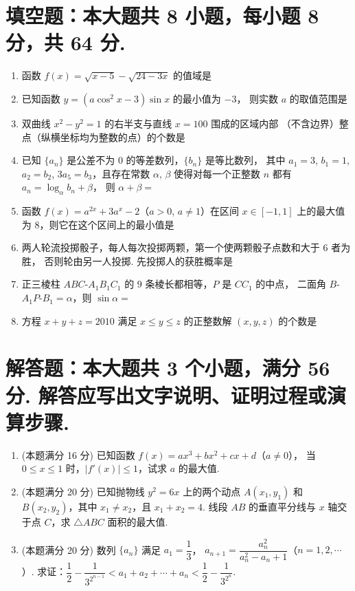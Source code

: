 \documentclass{chsmc}
\begin{document}
\section{填空题：本大题共 8 小题，每小题 8 分，共 64 分.}

\begin{enumerate}
	\item 函数 $f(x) = \sqrt{x-5} - \sqrt{24-3x}$ 的值域是 \blankline
	\item 已知函数 $y = (a\cos^2 x - 3)\sin x$ 的最小值为 $-3$，
		则实数 $a$ 的取值范围是 \blankline
	\item 双曲线 $x^2-y^2=1$ 的右半支与直线 $x=100$ 围成的区域内部
		（不含边界）整点（纵横坐标均为整数的点）的个数是 \blankline
	\item 已知 $\{a_n\}$ 是公差不为 $0$ 的等差数列，$\{b_n\}$ 是等比数列，
		其中 $a_1 = 3$, $b_1 = 1$, $a_2 = b_2$, $3a_5 = b_3$，且存在常数 $\alpha$, $\beta$
		使得对每一个正整数 $n$ 都有 $a_n = \log_{\alpha} b_n + \beta$，
		则 $\alpha + \beta =$ \blankline
	\item 函数 $f(x) = a^{2x} + 3a^x - 2$（$a > 0$, $a \neq 1$）在区间
		$x\in[-1,1]$ 上的最大值为 $8$，则它在这个区间上的最小值是 \blankline
	\item 两人轮流投掷骰子，每人每次投掷两颗，第一个使两颗骰子点数和大于 $6$ 者为胜，
		否则轮由另一人投掷. 先投掷人的获胜概率是 \blankline
	\item 正三棱柱 $ABC$-$A_1B_1C_1$ 的 $9$ 条棱长都相等，$P$ 是 $CC_1$ 的中点，
		二面角 $B$-$A_1P$-$B_1 = \alpha$，则 $\sin\alpha =$ \blankline
	\item 方程 $x + y + z = 2010$ 满足 $x \leqslant y \leqslant z$ 的正整数解
		$(x,y,z)$ 的个数是 \blankline
\end{enumerate}

\section{解答题：本大题共 3 个小题，满分 56 分. 解答应写出文字说明、证明过程或演算步骤.}

\begin{enumerate}[resume]
	\item (本题满分 16 分) 已知函数 $f(x) = ax^3 + bx^2 + cx + d$（$a \neq 0$），
		当 $0 \leqslant x \leqslant 1$ 时，$|f'(x)| \leqslant 1$，试求 $a$ 的最大值.
	\item (本题满分 20 分) 已知抛物线 $y^2 = 6x$ 上的两个动点
		$A(x_1,y_1)$ 和 $B(x_2,y_2)$，其中 $x_1 \neq x_2$，且 $x_1 + x_2 = 4$.
		线段 $AB$ 的垂直平分线与 $x$ 轴交于点 $C$，求 $\triangle ABC$ 面积的最大值.
	\item (本题满分 20 分) 数列 $\{a_n\}$ 满足 $a_1 = \dfrac{1}{3}$，
		$a_{n+1} = \dfrac{a_n^2}{a_n^2 - a_n + 1}$（$n = 1,2,\cdots$）.
		求证：$\dfrac{1}{2} - \dfrac{1}{3^{2^{n-1}}} < a_1 + a_2 + \cdots + a_n <
		\dfrac{1}{2} - \dfrac{1}{3^{2^n}}$.
\end{enumerate}
\end{document}
